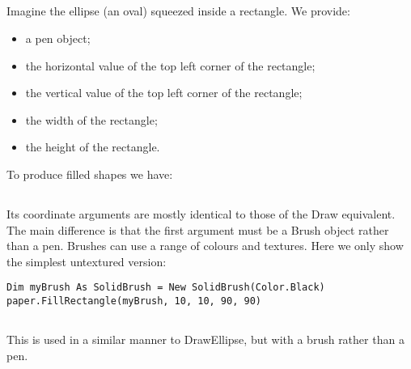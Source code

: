 		\subsection*{}
			Imagine the ellipse (an oval) squeezed inside a rectangle. We provide:
			\begin{itemize}
				\item a pen object;
				\item the horizontal value of the top left corner of the rectangle;
				\item the vertical value of the top left corner of the rectangle;
				\item the width of the rectangle;
				\item the height of the rectangle.
			\end{itemize}
			To produce filled shapes we have:
		
		\subsection*{}
			Its coordinate arguments are mostly identical to those of the Draw equivalent. The main difference is that the first argument must be a Brush object rather than a pen. Brushes can use a range of colours and textures. Here we only show the simplest untextured 
version:

		\begin{lstlisting}
Dim myBrush As SolidBrush = New SolidBrush(Color.Black)
paper.FillRectangle(myBrush, 10, 10, 90, 90)
		\end{lstlisting}

		\subsection*{}
			This is used in a similar manner to DrawEllipse, but with a brush rather than a pen.
		
